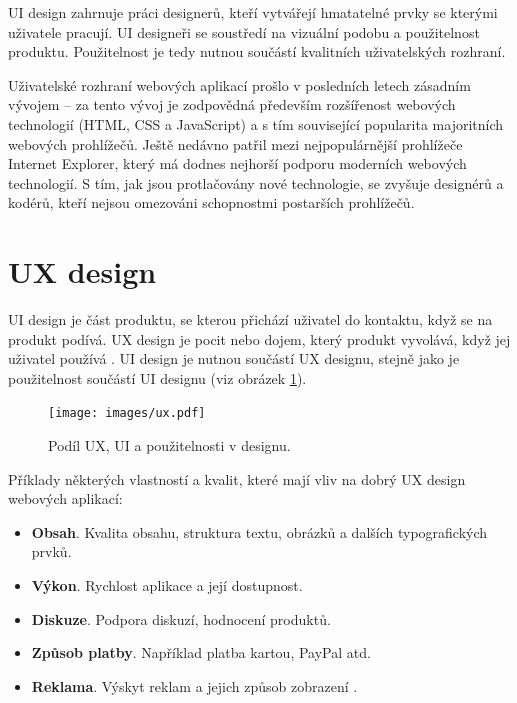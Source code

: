 UI design zahrnuje práci designerů, kteří vytvářejí hmatatelné prvky se kterými uživatele pracují. UI designeři se soustředí na vizuální podobu a použitelnost produktu. Použitelnost je tedy nutnou součástí kvalitních uživatelských rozhraní.

Uživatelské rozhraní webových aplikací prošlo v posledních letech zásadním vývojem -- za tento vývoj je zodpovědná především rozšířenost webových technologií (HTML, CSS a JavaScript) a s tím související popularita majoritních webových prohlížečů. Ještě nedávno patřil mezi nejpopulárnější prohlížeče Internet Explorer, který má dodnes nejhorší podporu moderních webových technologií. S tím, jak jsou protlačovány nové technologie, se zvyšuje  designérů a kodérů, kteří nejsou omezováni schopnostmi postarších prohlížečů.

\section{UX design}
\label{sec:uxdesign}

UI design je část produktu, se kterou přichází uživatel do kontaktu, když se na produkt podívá. UX design je pocit nebo dojem, který produkt vyvolává, když jej uživatel používá \cite{ui-vs-ux}. UI design je nutnou součástí UX designu, stejně jako je použitelnost součástí UI designu (viz obrázek \ref{fig:ux-ui-usability}).

\begin{figure}[htbp]
    \centering
    \texttt{[image: images/ux.pdf]}
    \caption{Podíl UX, UI a použitelnosti v designu.}
    \label{fig:ux-ui-usability}
\end{figure}

Příklady některých vlastností a kvalit, které mají vliv na dobrý UX design webových aplikací:

\begin{itemize}
    \item \textbf{Obsah}. Kvalita obsahu, struktura textu, obrázků a dalších typografických prvků.
    \item \textbf{Výkon}. Rychlost aplikace a její dostupnost.
    \item \textbf{Diskuze}. Podpora diskuzí, hodnocení produktů.
    \item \textbf{Způsob platby}. Například platba kartou, PayPal atd.
    \item \textbf{Reklama}. Výskyt reklam a jejich způsob zobrazení \cite{understanding-ux-ui}.
\end{itemize}

